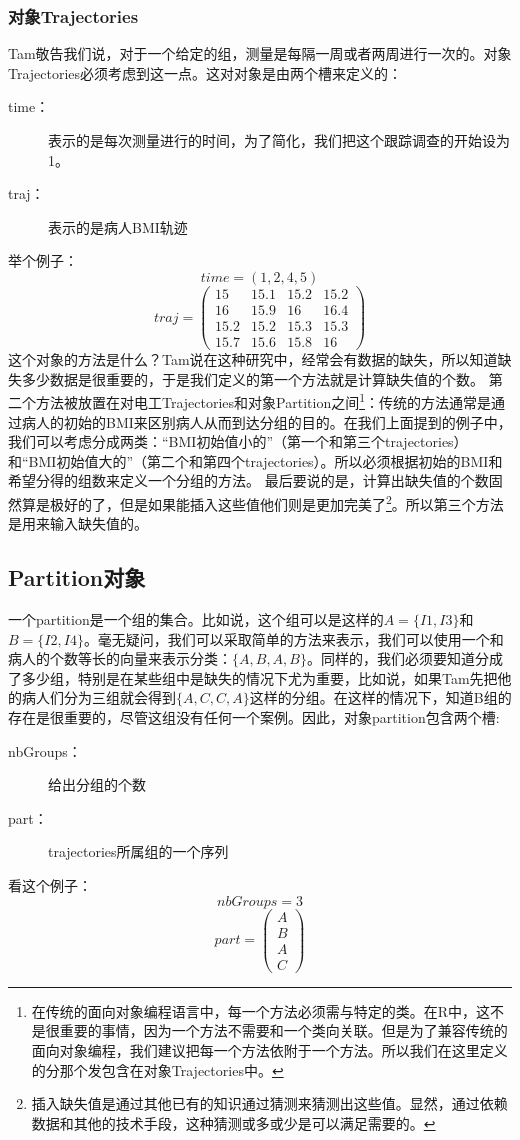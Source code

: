 \documentclass[12pt,a4paper]{article}\usepackage{graphicx, color}
\begin{document}
\subsubsection{对象Trajectories}
Tam敬告我们说，对于一个给定的组，测量是每隔一周或者两周进行一次的。对象Trajectories必须考虑到这一点。这对对象是由两个槽来定义的：
\begin{description}
  \item[time：]表示的是每次测量进行的时间，为了简化，我们把这个跟踪调查的开始设为1。
  \item[traj：]表示的是病人BMI轨迹
\end{description}
举个例子：
\[time=(1,2,4,5)\]
\[traj=\begin{pmatrix}15 & 15.1 & 15.2 & 15.2\\
16 & 15.9 & 16 & 16.4\\
15.2 & 15.2 & 15.3 & 15.3\\
15.7 & 15.6 & 15.8 & 16
\end{pmatrix}\]
这个对象的方法是什么？Tam说在这种研究中，经常会有数据的缺失，所以知道缺失多少数据是很重要的，于是我们定义的第一个方法就是计算缺失值的个数。
第二个方法被放置在对电工Trajectories和对象Partition之间\footnote{在传统的面向对象编程语言中，每一个方法必须需与特定的类。在R中，这不是很重要的事情，因为一个方法不需要和一个类向关联。但是为了兼容传统的面向对象编程，我们建议把每一个方法依附于一个方法。所以我们在这里定义的分那个发包含在对象Trajectories中。}：传统的方法通常是通过病人的初始的BMI来区别病人从而到达分组的目的。在我们上面提到的例子中，我们可以考虑分成两类：“BMI初始值小的”（第一个和第三个trajectories）和“BMI初始值大的”（第二个和第四个trajectories）。所以必须根据初始的BMI和希望分得的组数来定义一个分组的方法。
最后要说的是，计算出缺失值的个数固然算是极好的了，但是如果能插入这些值他们则是更加完美了\footnote{插入缺失值是通过其他已有的知识通过猜测来猜测出这些值。显然，通过依赖数据和其他的技术手段，这种猜测或多或少是可以满足需要的。}。所以第三个方法是用来输入缺失值的。

\subsection{Partition对象}
一个partition是一个组的集合。比如说，这个组可以是这样的$A=\{I1,I3\}$和$B=\{I2,I4\}$。毫无疑问，我们可以采取简单的方法来表示，我们可以使用一个和病人的个数等长的向量来表示分类：$\{A,B,A,B\}$。同样的，我们必须要知道分成了多少组，特别是在某些组中是缺失的情况下尤为重要，比如说，如果Tam先把他的病人们分为三组就会得到$\{A,C,C,A\}$这样的分组。在这样的情况下，知道B组的存在是很重要的，尽管这组没有任何一个案例。因此，对象partition包含两个槽:
\begin{description}
  \item[nbGroups：]给出分组的个数
  \item[part：]trajectories所属组的一个序列
\end{description}
看这个例子：
\[nbGroups=3\]
\[part=\begin{pmatrix}A\\
B\\
A\\
C
\end{pmatrix}
\]
\end{document}
